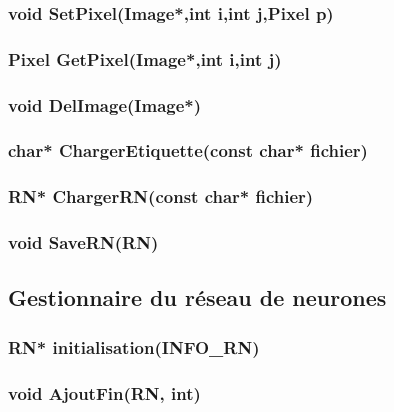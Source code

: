 \documentclass{article}
\begin{document}
		
		\subsubsection{\textcolor{myblue}{\textbf{void}} SetPixel(\textcolor{myblue}{\textbf{Image*}},\textcolor{myblue}{\textbf{int}} i,\textcolor{myblue}{\textbf{int}} j,Pixel p)}
		
		
		\subsubsection{\textcolor{myblue}{\textbf{Pixel}} GetPixel(\textcolor{myblue}{\textbf{Image*}},\textcolor{myblue}{\textbf{int}} i,\textcolor{myblue}{\textbf{int}} j)}
		
		
		\subsubsection{\textcolor{myblue}{\textbf{void}} DelImage(Image*)}
		
		
		\subsubsection{\textcolor{myblue}{\textbf{char*}} ChargerEtiquette(\textcolor{myblue}{\textbf{const char*}} fichier)}
		
		
		\subsubsection{\textcolor{myblue}{\textbf{RN*}} ChargerRN(\textcolor{myblue}{\textbf{const char*}} fichier)}
		
		
		\subsubsection{\textcolor{myblue}{\textbf{void}} SaveRN(\textcolor{myblue}{\textbf{RN}})}
		
		
	
	\subsection{Gestionnaire du réseau de neurones}
		\subsubsection{\textcolor{myblue}{\textbf{RN*}} initialisation(\textcolor{myblue}{\textbf{INFO\_RN}})}
		
		
		\subsubsection{\textcolor{myblue}{\textbf{void}} AjoutFin(\textcolor{myblue}{\textbf{RN}}, \textcolor{myblue}{\textbf{int}})}
		
\end{document}
